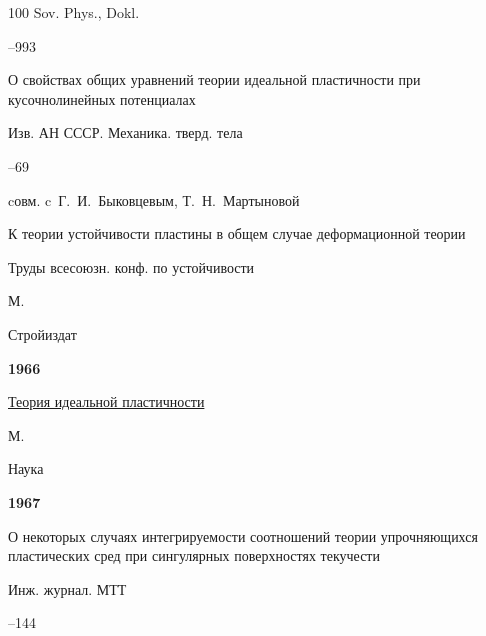 \begin{thebibliography}{100}
\jour Sov. Phys., Dokl. 



--993






\paper  О свойствах общих уравнений теории идеальной пластичности при кусочнолинейных потенциалах 

\jour Изв. АН СССР. Механика. тверд. тела



–69 

\miscnote cовм. c~Г.~И.~Быковцевым, Т.~Н.~Мартыновой




\paper К теории устойчивости пластины в общем случае деформационной теории

\inbook Труды всесоюзн. конф. по устойчивости

\publaddr М.

\publ Стройиздат




\item[] \centerline{\bf 1966}




\book \href{https://zbmath.org/?q=an:0161.21805}{Теория идеальной пластичности}

\publaddr М.

\publ Наука






\item[] \centerline{\bf 1967}




\paper О некоторых случаях интегрируемости соотношений теории упрочняющихся пластических сред при сингулярных поверхностях текучести 

\jour Инж. журнал. МТТ



–144 


\end{thebibliography}
